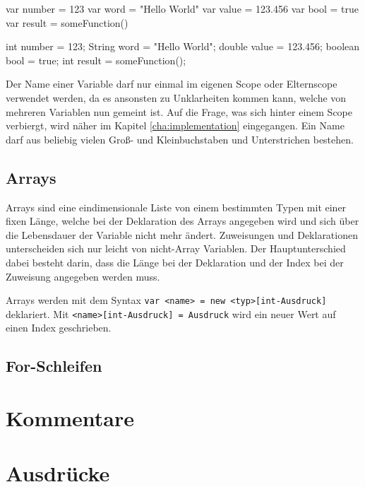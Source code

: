 \begin{ToyaCode}[numbers=none, caption={Variablendeklaration in toya}]
var number = 123
var word = "Hello World"
var value = 123.456
var bool = true
var result = someFunction()
\end{ToyaCode}

\begin{JavaCode}[numbers=none,caption={Variablendeklaration in Java (vor Version 10)}]
int number = 123;
String word = "Hello World";
double value = 123.456;
boolean bool = true;
int result = someFunction();
\end{JavaCode}

Der Name einer Variable darf nur einmal im eigenen Scope oder Elternscope verwendet werden, da es ansonsten zu Unklarheiten kommen kann, welche von mehreren Variablen nun gemeint ist. Auf die Frage, was sich hinter einem Scope verbiergt, wird näher im Kapitel \ref{cha:implementation} eingegangen. Ein Name darf aus beliebig vielen Groß- und Kleinbuchstaben und Unterstrichen bestehen. 

\subsection{Arrays}

Arrays sind eine eindimensionale Liste von einem bestimmten Typen mit einer fixen Länge, welche bei der Deklaration des Arrays angegeben wird und sich über die Lebensdauer der Variable nicht mehr ändert. Zuweisungen und Deklarationen unterscheiden sich nur leicht von nicht-Array Variablen. Der Hauptunterschied dabei besteht darin, dass die Länge bei der Deklaration und der Index bei der Zuweisung angegeben werden muss.

Arrays werden mit dem Syntax \texttt{var <name> = new <typ>[int-Ausdruck]} deklariert. Mit \texttt{<name>[int-Ausdruck] = Ausdruck} wird ein neuer Wert auf einen Index geschrieben.

\subsection{For-Schleifen}

\section{Kommentare}

\section{Ausdrücke}

